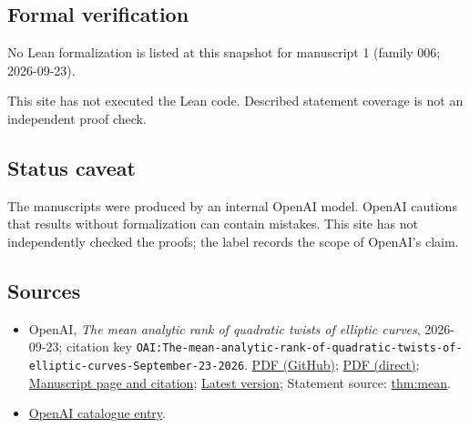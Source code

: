 \documentclass[11pt]{article}
\begin{document}
\subsection{Formal verification}
No Lean formalization is listed at this snapshot for manuscript 1 (family 006; 2026-09-23).

This site has not executed the Lean code. Described statement coverage is not an independent proof check.

\subsection{Status caveat}
The manuscripts were produced by an internal OpenAI model. OpenAI cautions that results without formalization can contain mistakes. This site has not independently checked the proofs; the label records the scope of OpenAI's claim.

\subsection{Sources}
\begin{itemize}
\item OpenAI, \emph{The mean analytic rank of quadratic twists of elliptic curves}, 2026-09-23; citation key \texttt{OAI:The-mean-analytic-rank-of-quadratic-twists-of-elliptic-curves-September-23-2026}. \href{https://github.com/openai/math/blob/adc7f1241b42e322a6451854ab7e4b4c146bf78a/preprints/The-mean-analytic-rank-of-quadratic-twists-of-elliptic-curves-September-23-2026/paper.pdf}{PDF (GitHub)}; \href{https://github.com/openai/math/raw/adc7f1241b42e322a6451854ab7e4b4c146bf78a/preprints/The-mean-analytic-rank-of-quadratic-twists-of-elliptic-curves-September-23-2026/paper.pdf}{PDF (direct)}; \href{https://github.com/openai/math/blob/adc7f1241b42e322a6451854ab7e4b4c146bf78a/preprints/The-mean-analytic-rank-of-quadratic-twists-of-elliptic-curves-September-23-2026/README.md}{Manuscript page and citation}; \href{https://github.com/openai/math/blob/main/preprints/The-mean-analytic-rank-of-quadratic-twists-of-elliptic-curves-September-23-2026/paper.pdf}{Latest version}; Statement source: \href{https://github.com/openai/math/blob/adc7f1241b42e322a6451854ab7e4b4c146bf78a/preprints/The-mean-analytic-rank-of-quadratic-twists-of-elliptic-curves-September-23-2026/build/sections/introduction.tex\#L22}{thm:mean}.
\item \href{https://github.com/openai/math/blob/adc7f1241b42e322a6451854ab7e4b4c146bf78a/CONTENTS.md}{OpenAI catalogue entry}.
\end{itemize}
\end{document}
